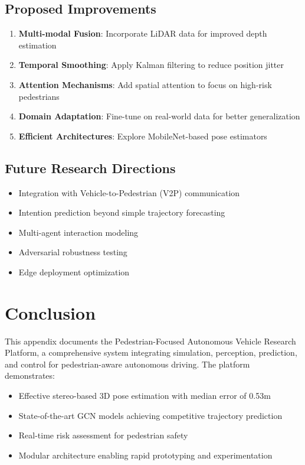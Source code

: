 \documentclass[11pt,a4paper]{article}
\begin{document}
\subsection{Proposed Improvements}

\begin{enumerate}
    \item \textbf{Multi-modal Fusion}: Incorporate LiDAR data for improved depth estimation
    \item \textbf{Temporal Smoothing}: Apply Kalman filtering to reduce position jitter
    \item \textbf{Attention Mechanisms}: Add spatial attention to focus on high-risk pedestrians
    \item \textbf{Domain Adaptation}: Fine-tune on real-world data for better generalization
    \item \textbf{Efficient Architectures}: Explore MobileNet-based pose estimators
\end{enumerate}

\subsection{Future Research Directions}

\begin{itemize}
    \item Integration with Vehicle-to-Pedestrian (V2P) communication
    \item Intention prediction beyond simple trajectory forecasting
    \item Multi-agent interaction modeling
    \item Adversarial robustness testing
    \item Edge deployment optimization
\end{itemize}

\section{Conclusion}

This appendix documents the Pedestrian-Focused Autonomous Vehicle Research Platform, a comprehensive system integrating simulation, perception, prediction, and control for pedestrian-aware autonomous driving. The platform demonstrates:

\begin{itemize}
    \item Effective stereo-based 3D pose estimation with median error of 0.53m
    \item State-of-the-art GCN models achieving competitive trajectory prediction
    \item Real-time risk assessment for pedestrian safety
    \item Modular architecture enabling rapid prototyping and experimentation
\end{itemize}
\end{document}
